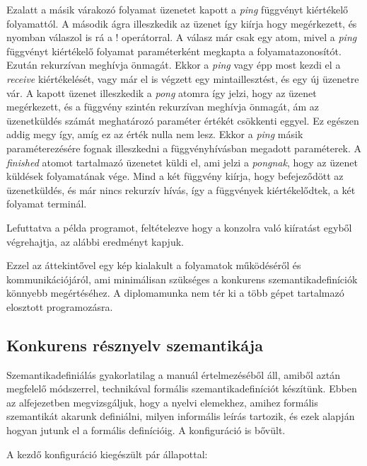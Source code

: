 Ezalatt a másik várakozó folyamat üzenetet kapott a \textit{ping} függvényt kiértékelő folyamattól. A második ágra illeszkedik az üzenet így kiírja hogy megérkezett, és nyomban válaszol is rá a ! operátorral. A válasz már csak egy atom, mivel a \textit{ping} függvényt kiértékelő folyamat paraméterként megkapta a folyamatazonosítót. Ezután rekurzívan meghívja önmagát. Ekkor a \textit{ping} vagy épp most kezdi el a \textit{receive} kiértékelését, vagy már el is végzett egy mintaillesztést, és egy új üzenetre vár. A kapott üzenet illeszkedik a \textit{pong} atomra így jelzi, hogy az üzenet megérkezett, és a függvény szintén rekurzívan meghívja önmagát, ám az üzenetküldés számát meghatározó paraméter értékét csökkenti eggyel. Ez egészen addig megy így, amíg ez az érték nulla nem lesz. Ekkor a \textit{ping} másik paraméterezésére fognak illeszkedni a függvényhívásban megadott paraméterek. A \textit{finished} atomot tartalmazó üzenetet küldi el, ami jelzi a \textit{pongnak}, hogy az üzenet küldések folyamatának vége. Mind a két függvény kiírja, hogy befejeződött az üzenetküldés, és már nincs rekurzív hívás, így a függvények kiértékelődtek, a két folyamat terminál.

Lefuttatva a példa programot, feltételezve hogy a konzolra való kiíratást egyből végrehajtja, az alábbi eredményt kapjuk.



Ezzel az áttekintővel egy kép kialakult a folyamatok működéséről és kommunikációjáról, ami minimálisan szükséges a konkurens szemantikadefiníciók könnyebb megértéséhez. A diplomamunka nem tér ki a több gépet tartalmazó elosztott programozásra.

\subsection{Konkurens résznyelv szemantikája}

Szemantikadefiniálás gyakorlatilag a manuál értelmezéséből áll, amiből aztán megfelelő módszerrel, technikával formális szemantikadefiníciót készítünk. Ebben az alfejezetben megvizsgáljuk, hogy a nyelvi elemekhez, amihez formális szemantikát akarunk definiálni, milyen informális leírás tartozik, és ezek alapján hogyan jutunk el a formális definícióig. A konfiguráció is bővült.





A kezdő konfiguráció kiegészült pár állapottal:

